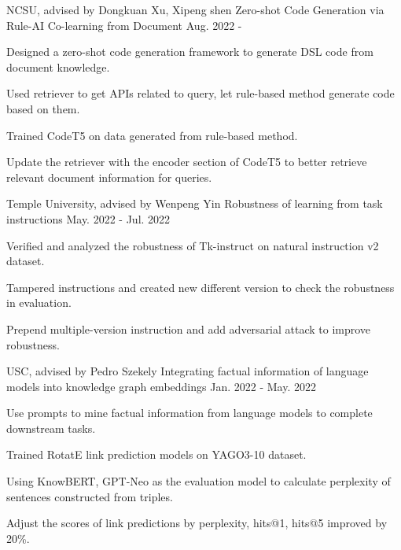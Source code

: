 
\begin{cventries}

  \cventry
    {NCSU, advised by Dongkuan Xu, Xipeng shen} %
    {Zero-shot Code Generation via Rule-AI Co-learning from Document} %
    {} %
    {Aug. 2022 - } %
    { 
     \begin{cvitems} %
       \item{Designed a zero-shot code generation framework to generate DSL code from document knowledge.}
       \item{Used retriever to get APIs related to query, let rule-based method generate code based on them.}
       \item{Trained CodeT5 on data generated from rule-based method.}
       \item{Update the retriever with the encoder section of CodeT5 to better retrieve relevant document information for queries.}
     \end{cvitems}
    }

 \vspace{0mm} 


  \cventry
{Temple University, advised by Wenpeng Yin} %
{Robustness of learning from task instructions} %
{} %
{May. 2022 - Jul. 2022} %
{ 
	     \begin{cvitems} %
		       \item{Verified and analyzed the robustness of Tk-instruct on natural instruction v2 dataset.}
		       \item{Tampered instructions and created new different version to check the robustness in evaluation.}
		       \item{Prepend multiple-version instruction and add adversarial attack to improve robustness.}
		     \end{cvitems}
}

 \vspace{0mm} 
 
  \cventry
{USC, advised by Pedro Szekely} %
{Integrating factual information of language models into knowledge graph embeddings} %
{} %
{Jan. 2022 - May. 2022} %
{ 
	     \begin{cvitems} %
		       \item{Use prompts to mine factual information from language models to complete downstream tasks.}
		       \item{Trained RotatE link prediction models on YAGO3-10 dataset.}
		       \item{Using KnowBERT, GPT-Neo as the evaluation model to calculate perplexity of sentences constructed from triples.}
                  \item{Adjust the scores of link predictions by perplexity, hits@1, hits@5 improved by 20\%.}
		     \end{cvitems}
}


 
 \vspace{0mm} 

\end{cventries}
